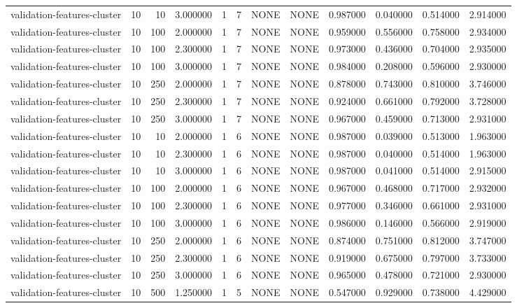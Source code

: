 \begin{tabular}{lrrrllllrrrr}
validation-features-cluster & 10 & 10 & 3.000000 & 1 & 7 & NONE & NONE & 0.987000 & 0.040000 & 0.514000 & 2.914000 \\
validation-features-cluster & 10 & 100 & 2.000000 & 1 & 7 & NONE & NONE & 0.959000 & 0.556000 & 0.758000 & 2.934000 \\
validation-features-cluster & 10 & 100 & 2.300000 & 1 & 7 & NONE & NONE & 0.973000 & 0.436000 & 0.704000 & 2.935000 \\
validation-features-cluster & 10 & 100 & 3.000000 & 1 & 7 & NONE & NONE & 0.984000 & 0.208000 & 0.596000 & 2.930000 \\
validation-features-cluster & 10 & 250 & 2.000000 & 1 & 7 & NONE & NONE & 0.878000 & 0.743000 & 0.810000 & 3.746000 \\
validation-features-cluster & 10 & 250 & 2.300000 & 1 & 7 & NONE & NONE & 0.924000 & 0.661000 & 0.792000 & 3.728000 \\
validation-features-cluster & 10 & 250 & 3.000000 & 1 & 7 & NONE & NONE & 0.967000 & 0.459000 & 0.713000 & 2.931000 \\
validation-features-cluster & 10 & 10 & 2.000000 & 1 & 6 & NONE & NONE & 0.987000 & 0.039000 & 0.513000 & 1.963000 \\
validation-features-cluster & 10 & 10 & 2.300000 & 1 & 6 & NONE & NONE & 0.987000 & 0.040000 & 0.514000 & 1.963000 \\
validation-features-cluster & 10 & 10 & 3.000000 & 1 & 6 & NONE & NONE & 0.987000 & 0.041000 & 0.514000 & 2.915000 \\
validation-features-cluster & 10 & 100 & 2.000000 & 1 & 6 & NONE & NONE & 0.967000 & 0.468000 & 0.717000 & 2.932000 \\
validation-features-cluster & 10 & 100 & 2.300000 & 1 & 6 & NONE & NONE & 0.977000 & 0.346000 & 0.661000 & 2.931000 \\
validation-features-cluster & 10 & 100 & 3.000000 & 1 & 6 & NONE & NONE & 0.986000 & 0.146000 & 0.566000 & 2.919000 \\
validation-features-cluster & 10 & 250 & 2.000000 & 1 & 6 & NONE & NONE & 0.874000 & 0.751000 & 0.812000 & 3.747000 \\
validation-features-cluster & 10 & 250 & 2.300000 & 1 & 6 & NONE & NONE & 0.919000 & 0.675000 & 0.797000 & 3.733000 \\
validation-features-cluster & 10 & 250 & 3.000000 & 1 & 6 & NONE & NONE & 0.965000 & 0.478000 & 0.721000 & 2.930000 \\
validation-features-cluster & 10 & 500 & 1.250000 & 1 & 5 & NONE & NONE & 0.547000 & 0.929000 & 0.738000 & 4.429000 \\

\end{tabular}

